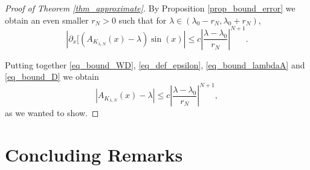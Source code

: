 \documentclass{amsart}
\begin{document}
\begin{proof}[Proof of Theorem \ref{thm_approximate}]

By Proposition \ref{prop_bound_error} we obtain an even smaller $r_N>0$ such that for $\lambda \in (\lambda_0-r_N, \lambda_0 + r_N)$,
\begin{equation}
	\label{eq_bound_D}
	|\partial_x[ (A_{K_{\lambda,N}}(x) -\lambda) \sin(x)| \leq c\left|\frac{\lambda - \lambda_0}{r_N} \right|^{N+1}.
\end{equation}

Putting together \eqref{eq_bound_WD}, \eqref{eq_def_epsilon}, \eqref{eq_bound_lambdaA} and \eqref{eq_bound_D} we obtain
\[ |A_{K_{\lambda,N}}(x) -\lambda| \leq c \left|\frac{\lambda - \lambda_0}{r_N}\right|^{N+1},\]
as we wanted to show.
\end{proof}

\section{Concluding Remarks}
\end{document}
